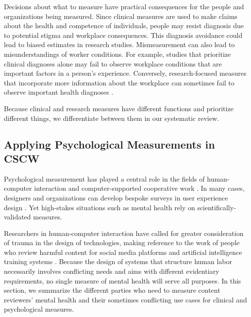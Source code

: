 Decisions about what to measure have practical consequences for the people and organizations being measured. Since clinical measures are used to make claims about the health and competence of individuals, people may resist diagnosis due to potential stigma and workplace consequences. This diagnosis avoidance could lead to biased estimates in research studies. Mismeasurement can also lead to misunderstandings of worker conditions. For example, studies that prioritize clinical diagnoses alone may fail to observe workplace conditions that are important factors in a person's experience. Conversely, research-focused measures that incorporate more information about the workplace can sometimes fail to observe important health diagnoses \cite{tetrick2023handbook}.

Because clinical and research measures have different functions and prioritize different things, we differentiate between them in our systematic review. 

\subsection{Applying Psychological Measurements in CSCW}
Psychological measurement has played a central role in the fields of human-computer interaction and computer-supported cooperative work \cite{card_psychology_1986, olson_research_1997, finholt_psychology_1998,norman_design_2013, kiesler_social_1984}. In many cases, designers and organizations can develop bespoke surveys in user experience design \cite{ozok_survey_2007}. Yet high-stakes situations such as mental health rely on scientifically-validated measures.

Researchers in human-computer interaction have called for greater consideration of trauma in the design of technologies, making reference to the work of people who review harmful content for social media platforms \cite{scott_trauma-informed_2023} and artificial intelligence training systems \cite{zhang_human_2024}. Because the design of systems that structure human labor necessarily involves conflicting needs and aims \cite{gregory_scandinavian_2003} with different evidentiary requirements, no single measure of mental health will serve all purposes. In this section, we summarize the different parties who need to measure content reviewers' mental health and their sometimes conflicting use cases for clinical and psychological measures.

